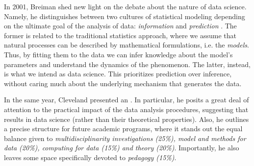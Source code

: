 In 2001, Breiman shed new light on the debate about the nature of data science. Namely, he distinguishes between two cultures of statistical modeling depending on the ultimate goal of the analysis of data: \textit{information} and \textit{prediction} \cite{breiman2001statistical}.
The former is related to the traditional statistics approach, where we assume that natural processes can be described by mathematical formulations, i.e. the \textit{models}. Thus, by fitting them to the data we can infer knowledge about the model's parameters and understand the dynamics of the phenomenon.
The latter, instead, is what we intend as data science. This prioritizes prediction over inference, without caring much about the underlying mechanism that generates the data.

In the same year, Cleveland presented an  \cite{cleveland2001data}. In particular, he posits a great deal of attention to the practical impact of the data analysis procedures, suggesting that  results in data science  (rather than their theoretical properties).
Also, he outlines a precise structure for future academic programs, where it stands out the equal balance given to \textit{multidisciplinarity investigations (25\%), model and methods for data (20\%), computing for data (15\%) and theory (20\%)}. 
Importantly, he also leaves some space specifically devoted to \textit{pedagogy (15\%)}. 


